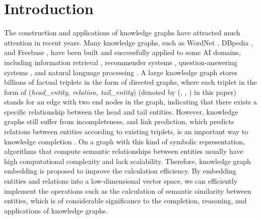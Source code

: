 \documentclass[conference]{IEEEtran}
\begin{document}
\section{Introduction} \label{Introduction}
The construction and applications of knowledge graphs have attracted much attention in recent years. Many knowledge graphs, such as WordNet \cite{WordNet}, DBpedia \cite{DBpedia}, and Freebase \cite{Freebase}, have been built and successfully applied to some AI domains, including information retrieval \cite{Retrieval}, recommender systems \cite{Recommender}, question-answering systems \cite{HaoQA,HuangQA}, and natural language processing \cite{NLP}. A large knowledge graph stores billions of factual triplets in the form of directed graphs, where each triplet in the form of (\textit{head\_entity, relation, tail\_entity}) (denoted by (, , ) in this paper) stands for an edge with two end nodes in the graph, indicating that there exists a specific relationship between the head and tail entities. However, knowledge graphs still suffer from incompleteness, and link prediction, which predicts relations between entities according to existing triplets, is an important way to knowledge completion \cite{bootstrapping,Trustworthiness}. On a graph with this kind of symbolic representation, algorithms that compute semantic relationships between entities usually have high computational complexity and lack scalability. Therefore, knowledge graph embedding is proposed to improve the calculation efficiency. By embedding entities and relations into a low-dimensional vector space, we can efficiently implement the operations such as the calculation of semantic similarity between entities, which is of considerable significance to the completion, reasoning, and applications of knowledge graphs.
\end{document}
